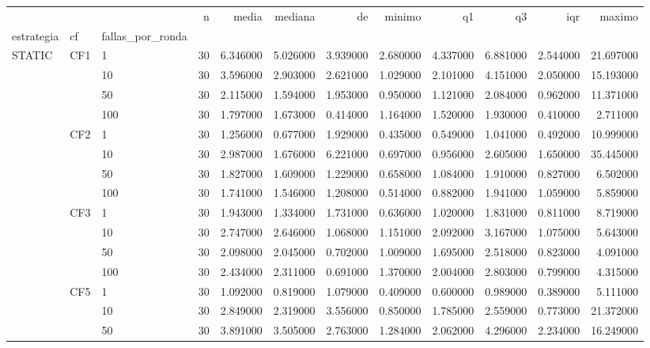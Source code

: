\begin{tabular}{lllrrrrrrrrr}
\toprule
 &  &  & n & media & mediana & de & minimo & q1 & q3 & iqr & maximo \\
estrategia & cf & fallas_por_ronda &  &  &  &  &  &  &  &  &  \\
\midrule
\multirow[t]{16}{*}{STATIC} & \multirow[t]{4}{*}{CF1} & 1 & 30 & 6.346000 & 5.026000 & 3.939000 & 2.680000 & 4.337000 & 6.881000 & 2.544000 & 21.697000 \\
 &  & 10 & 30 & 3.596000 & 2.903000 & 2.621000 & 1.029000 & 2.101000 & 4.151000 & 2.050000 & 15.193000 \\
 &  & 50 & 30 & 2.115000 & 1.594000 & 1.953000 & 0.950000 & 1.121000 & 2.084000 & 0.962000 & 11.371000 \\
 &  & 100 & 30 & 1.797000 & 1.673000 & 0.414000 & 1.164000 & 1.520000 & 1.930000 & 0.410000 & 2.711000 \\
\cline{2-12}
 & \multirow[t]{4}{*}{CF2} & 1 & 30 & 1.256000 & 0.677000 & 1.929000 & 0.435000 & 0.549000 & 1.041000 & 0.492000 & 10.999000 \\
 &  & 10 & 30 & 2.987000 & 1.676000 & 6.221000 & 0.697000 & 0.956000 & 2.605000 & 1.650000 & 35.445000 \\
 &  & 50 & 30 & 1.827000 & 1.609000 & 1.229000 & 0.658000 & 1.084000 & 1.910000 & 0.827000 & 6.502000 \\
 &  & 100 & 30 & 1.741000 & 1.546000 & 1.208000 & 0.514000 & 0.882000 & 1.941000 & 1.059000 & 5.859000 \\
\cline{2-12}
 & \multirow[t]{4}{*}{CF3} & 1 & 30 & 1.943000 & 1.334000 & 1.731000 & 0.636000 & 1.020000 & 1.831000 & 0.811000 & 8.719000 \\
 &  & 10 & 30 & 2.747000 & 2.646000 & 1.068000 & 1.151000 & 2.092000 & 3.167000 & 1.075000 & 5.643000 \\
 &  & 50 & 30 & 2.098000 & 2.045000 & 0.702000 & 1.009000 & 1.695000 & 2.518000 & 0.823000 & 4.091000 \\
 &  & 100 & 30 & 2.434000 & 2.311000 & 0.691000 & 1.370000 & 2.004000 & 2.803000 & 0.799000 & 4.315000 \\
\cline{2-12}
 & \multirow[t]{4}{*}{CF5} & 1 & 30 & 1.092000 & 0.819000 & 1.079000 & 0.409000 & 0.600000 & 0.989000 & 0.389000 & 5.111000 \\
 &  & 10 & 30 & 2.849000 & 2.319000 & 3.556000 & 0.850000 & 1.785000 & 2.559000 & 0.773000 & 21.372000 \\
 &  & 50 & 30 & 3.891000 & 3.505000 & 2.763000 & 1.284000 & 2.062000 & 4.296000 & 2.234000 & 16.249000 \\

\end{tabular}
